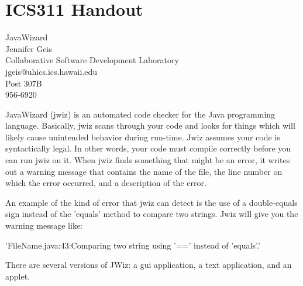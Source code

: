 

\appendix
\chapter{ICS311 Handout}
\begin{center}
    JavaWizard\\
    Jennifer Geis\\
    Collaborative Software Development Laboratory\\
    jgeis@uhics.ics.hawaii.edu\\
    Post 307B\\
    956-6920\\
\end{center}

    JavaWizard (jwiz) is an automated code checker for the Java programming
    language.  Basically, jwiz scans through your code and looks for things 
    which will likely cause unintended behavior during run-time.  Jwiz
    assumes your code is syntactically legal.  In other words, your code
    must compile correctly before you can run jwiz on it.  When 
    jwiz finds something that might be an error, it writes out a warning
    message that contains the name of the file, the line number on which
    the error occurred, and a description of the error. 

    An example of the kind of error that jwiz can detect is the use of a
    double-equals sign instead of the 'equals' method to compare two
    strings. Jwiz will give you the warning message like: 

      'FileName.java:43:Comparing two string using '==' instead of
      'equals'.'
      
      There are several versions of JWiz: a gui application, a text
      application, and an applet.

